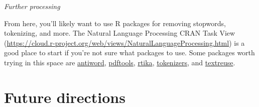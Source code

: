 \documentclass[author-year, review, 11pt]{components/elsarticle} %
\newenvironment{Shaded}{\begin{snugshade}}{\end{snugshade}}
\newcommand{\CommentTok}[1]{\textcolor[rgb]{0.56,0.35,0.01}{\textit{#1}}}
\newcommand{\DataTypeTok}[1]{\textcolor[rgb]{0.13,0.29,0.53}{#1}}
\newcommand{\DecValTok}[1]{\textcolor[rgb]{0.00,0.00,0.81}{#1}}
\newcommand{\KeywordTok}[1]{\textcolor[rgb]{0.13,0.29,0.53}{\textbf{#1}}}
\newcommand{\NormalTok}[1]{#1}
\newcommand{\OperatorTok}[1]{\textcolor[rgb]{0.81,0.36,0.00}{\textbf{#1}}}
\newcommand{\StringTok}[1]{\textcolor[rgb]{0.31,0.60,0.02}{#1}}
\begin{document}
\begin{Shaded}
\end{Shaded}

\emph{Further processing}

From here, you'll likely want to use R packages for removing stopwords,
tokenizing, and more. The Natural Language Processing CRAN Task View
(\url{https://cloud.r-project.org/web/views/NaturalLanguageProcessing.html})
is a good place to start if you're not sure what packages to use. Some
packages worth trying in this space are
\href{https://github.com/ropensci/antiword}{antiword},
\href{https://github.com/ropensci/pdftools}{pdftools},
\href{https://github.com/ropensci/rtika}{rtika},
\href{https://github.com/ropensci/tokenizers}{tokenizers}, and
\href{https://github.com/ropensci/textreuse}{textreuse}.

\hypertarget{future-directions}{%
\section{Future directions}\label{future-directions}}
\end{document}
